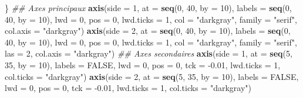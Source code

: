 \documentclass[]{article}
\newenvironment{Shaded}{\begin{snugshade}}{\end{snugshade}}
\newcommand{\CommentTok}[1]{\textcolor[rgb]{0.56,0.35,0.01}{\textit{#1}}}
\newcommand{\DataTypeTok}[1]{\textcolor[rgb]{0.13,0.29,0.53}{#1}}
\newcommand{\DecValTok}[1]{\textcolor[rgb]{0.00,0.00,0.81}{#1}}
\newcommand{\FloatTok}[1]{\textcolor[rgb]{0.00,0.00,0.81}{#1}}
\newcommand{\KeywordTok}[1]{\textcolor[rgb]{0.13,0.29,0.53}{\textbf{#1}}}
\newcommand{\NormalTok}[1]{#1}
\newcommand{\OtherTok}[1]{\textcolor[rgb]{0.56,0.35,0.01}{#1}}
\newcommand{\StringTok}[1]{\textcolor[rgb]{0.31,0.60,0.02}{#1}}
\begin{document}
\begin{Shaded}
\begin{Highlighting}[]
\NormalTok{\}}
\CommentTok{## Axes principaux}
\KeywordTok{axis}\NormalTok{(}\DataTypeTok{side =} \DecValTok{1}\NormalTok{, }\DataTypeTok{at =} \KeywordTok{seq}\NormalTok{(}\DecValTok{0}\NormalTok{, }\DecValTok{40}\NormalTok{, }\DataTypeTok{by =} \DecValTok{10}\NormalTok{), }\DataTypeTok{labels =} \KeywordTok{seq}\NormalTok{(}\DecValTok{0}\NormalTok{, }\DecValTok{40}\NormalTok{, }\DataTypeTok{by =} \DecValTok{10}\NormalTok{), }\DataTypeTok{lwd =} \DecValTok{0}\NormalTok{, }\DataTypeTok{pos =} \DecValTok{0}\NormalTok{, }\DataTypeTok{lwd.ticks =} \DecValTok{1}\NormalTok{,}
\DataTypeTok{col =} \StringTok{"darkgray"}\NormalTok{, }\DataTypeTok{family =} \StringTok{"serif"}\NormalTok{, }\DataTypeTok{col.axis =} \StringTok{"darkgray"}\NormalTok{)}
\KeywordTok{axis}\NormalTok{(}\DataTypeTok{side =} \DecValTok{2}\NormalTok{, }\DataTypeTok{at =} \KeywordTok{seq}\NormalTok{(}\DecValTok{0}\NormalTok{, }\DecValTok{40}\NormalTok{, }\DataTypeTok{by =} \DecValTok{10}\NormalTok{), }\DataTypeTok{labels =} \KeywordTok{seq}\NormalTok{(}\DecValTok{0}\NormalTok{, }\DecValTok{40}\NormalTok{, }\DataTypeTok{by =} \DecValTok{10}\NormalTok{), }\DataTypeTok{lwd =} \DecValTok{0}\NormalTok{, }\DataTypeTok{pos =} \DecValTok{0}\NormalTok{, }\DataTypeTok{lwd.ticks =} \DecValTok{1}\NormalTok{,}
\DataTypeTok{col =} \StringTok{"darkgray"}\NormalTok{, }\DataTypeTok{family =} \StringTok{"serif"}\NormalTok{, }\DataTypeTok{las =} \DecValTok{2}\NormalTok{, }\DataTypeTok{col.axis =} \StringTok{"darkgray"}\NormalTok{)}
\CommentTok{## Axes secondaires}
\KeywordTok{axis}\NormalTok{(}\DataTypeTok{side =} \DecValTok{1}\NormalTok{, }\DataTypeTok{at =} \KeywordTok{seq}\NormalTok{(}\DecValTok{5}\NormalTok{, }\DecValTok{35}\NormalTok{, }\DataTypeTok{by =} \DecValTok{10}\NormalTok{), }\DataTypeTok{labels =} \OtherTok{FALSE}\NormalTok{, }\DataTypeTok{lwd =} \DecValTok{0}\NormalTok{, }\DataTypeTok{pos =} \DecValTok{0}\NormalTok{, }\DataTypeTok{tck =} \FloatTok{-0.01}\NormalTok{, }\DataTypeTok{lwd.ticks =} \DecValTok{1}\NormalTok{,}
\DataTypeTok{col.ticks =} \StringTok{"darkgray"}\NormalTok{)}
\KeywordTok{axis}\NormalTok{(}\DataTypeTok{side =} \DecValTok{2}\NormalTok{, }\DataTypeTok{at =} \KeywordTok{seq}\NormalTok{(}\DecValTok{5}\NormalTok{, }\DecValTok{35}\NormalTok{, }\DataTypeTok{by =} \DecValTok{10}\NormalTok{), }\DataTypeTok{labels =} \OtherTok{FALSE}\NormalTok{, }\DataTypeTok{lwd =} \DecValTok{0}\NormalTok{, }\DataTypeTok{pos =} \DecValTok{0}\NormalTok{, }\DataTypeTok{tck =} \FloatTok{-0.01}\NormalTok{, }\DataTypeTok{lwd.ticks =} \DecValTok{1}\NormalTok{,}
\DataTypeTok{col.ticks =} \StringTok{"darkgray"}\NormalTok{)}

\end{Highlighting}
\end{Shaded}
\end{document}
